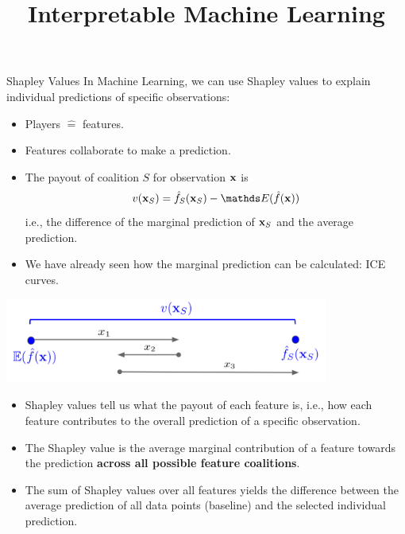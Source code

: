 \documentclass[11pt,compress,t,notes=noshow, xcolor=table]{beamer}
\title{Interpretable Machine Learning}
\institute{\href{https://compstat-lmu.github.io/lecture_i2ml/}{compstat-lmu.github.io/lecture\_i2ml}}
\date{}
\begin{document}

\begin{vbframe}{Shapley Values}
In Machine Learning, we can use Shapley values to explain individual predictions of specific observations: 
\begin{itemize}
  \item Players $\hat{=}$ features.
  \item Features collaborate to make a prediction.
  \item The payout of coalition $S$ for observation $\xv$ is 
  $$v(\xv_S) =  \fh_{S} (\xv_S) - \E (\fh(\xv))$$ 
  i.e., the difference of the marginal prediction of $\xv_S$ and the average prediction.
  \item We have already seen how the marginal prediction can be calculated: ICE curves. 
\end{itemize}
\begin{center}
\vspace{-0.3cm}
\includegraphics[width=0.8\textwidth]{figure_man/shapley_valuefct}
\end{center}
\framebreak

\begin{itemize}
 \item Shapley values tell us what the payout of each feature is, i.e., how each feature contributes to the overall prediction of a specific observation.  
    \item The Shapley value is the average marginal contribution of a feature towards the prediction \textbf{across all possible feature coalitions}.
    \item The sum of Shapley values over all features yields the difference between the average prediction of all data points (baseline) and the selected individual prediction.
  \end{itemize}
\end{vbframe}
\end{document}
